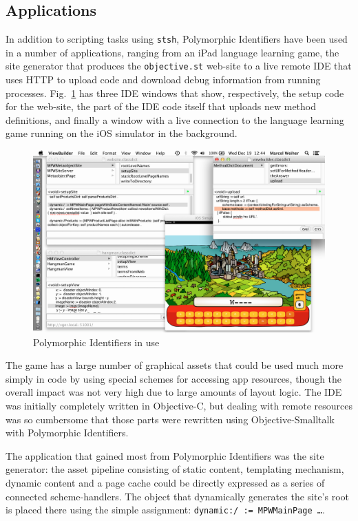 \documentclass[preprint]{sigplanconf}
\begin{document}
\subsection{Applications}

In addition to scripting tasks using {\tt stsh}, Polymorphic Identifiers have been used in a number
of applications, ranging from an iPad language learning game, the site generator that produces the {\tt objective.st} web-site to a
live remote IDE that uses HTTP to upload code and download debug information from running processes.  Fig.~\ref{pi-inuse}
has three IDE windows that show, respectively, the setup code for the web-site, the part of the IDE code itself that uploads new method definitions,
and finally a window with a live connection to the language learning game running on the iOS simulator in the background.

\begin{figure}[htbp]
\centering
\includegraphics[scale=0.50,page=1]{PolymorphicIdentifiersInUse.png}
\caption{Polymorphic Identifiers in use}
\label{pi-inuse}
\end{figure}


The game has a large number of graphical assets that could be used much more simply in code by using special schemes for accessing app
resources, though the overall impact was not very high due to large amounts of layout logic. 
 The IDE was initially completely written in Objective-C, but dealing with remote resources was so cumbersome that
those parts were rewritten using Objective-Smalltalk with Polymorphic Identifiers.

The application that gained most from Polymorphic Identifiers was the site generator:  the asset pipeline consisting of static
content, templating mechanism, dynamic content and a page cache could be directly expressed as a series of connected
scheme-handlers.  The object that dynamically generates the site's root is placed there using the simple assignment: {\tt dynamic:/  := MPWMainPage \dots}.
\end{document}

